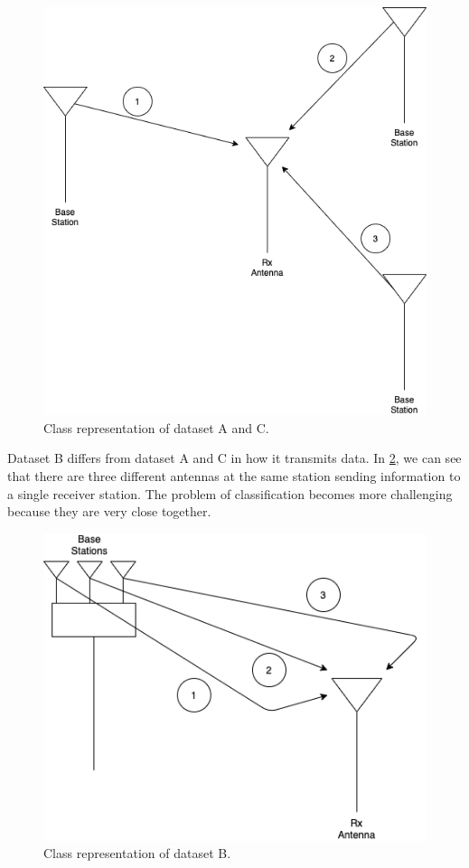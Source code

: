 \documentclass{turabian-thesis}
\begin{document}
\begin{figure}[h!]
   \begin{center}
      \includegraphics[scale=0.4]{../media/dataset_ac.png}
   \end{center}
   \caption{Class representation of dataset A and C.}
   \label{fig:dataset_ac}
\end{figure}

Dataset B differs from dataset A and C in how it transmits data. In \ref{fig:dataset_b}, we can see that there are three different antennas at the same station sending information to a single receiver station. The problem of classification becomes more challenging because they are very close together.

\begin{figure}[h!]
   \begin{center}
      \includegraphics[scale=0.5]{../media/dataset_b.png}
   \end{center}
   \caption{Class representation of dataset B.}
   \label{fig:dataset_b}
\end{figure}
\end{document}
